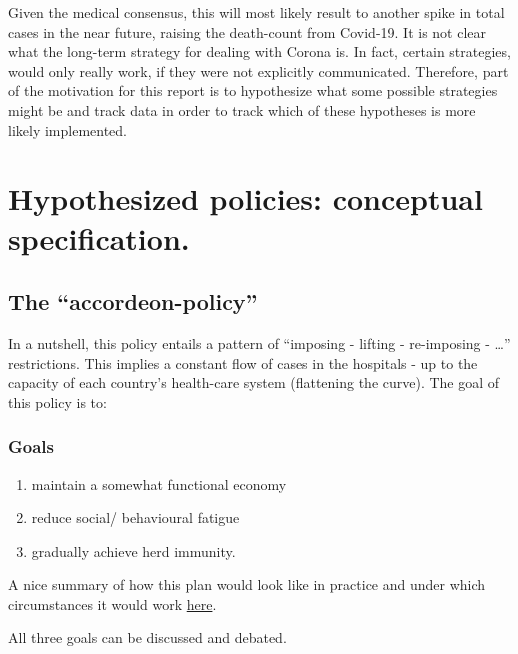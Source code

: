 \documentclass[
  english,
  ,doc,floatsintext]{apa6}
\providecommand{\tightlist}{%
  \setlength{\itemsep}{0pt}\setlength{\parskip}{0pt}}
\begin{document}
Given the medical consensus, this will most likely result to another spike in total cases in the near future, raising the death-count from Covid-19.
It is not clear what the long-term strategy for dealing with Corona is.
In fact, certain strategies, would only really work, if they were not explicitly communicated.
Therefore, part of the motivation for this report is to hypothesize what some possible strategies might be and track data in order to track which of these hypotheses is more likely implemented.

\hypertarget{hypothesized-policies-conceptual-specification.}{%
\section{Hypothesized policies: conceptual specification.}\label{hypothesized-policies-conceptual-specification.}}

\hypertarget{the-accordeon-policy}{%
\subsection{\texorpdfstring{The \enquote{accordeon-policy}}{The `accordeon-policy'}}\label{the-accordeon-policy}}

In a nutshell, this policy entails a pattern of \enquote{imposing - lifting - re-imposing - \ldots{}} restrictions.
This implies a constant flow of cases in the hospitals - up to the capacity of each country's health-care system (flattening the curve).
The goal of this policy is to:

\hypertarget{goals}{%
\subsubsection{Goals}\label{goals}}

\begin{enumerate}
\def\labelenumi{\arabic{enumi}.}
\tightlist
\item
  maintain a somewhat functional economy
\item
  reduce social/ behavioural fatigue
\item
  gradually achieve herd immunity.
\end{enumerate}

A nice summary of how this plan would look like in practice and under which circumstances it would work \href{https://twitter.com/iandonald_psych/status/1238518371651649538?s=19}{here}.

All three goals can be discussed and debated.
\end{document}
